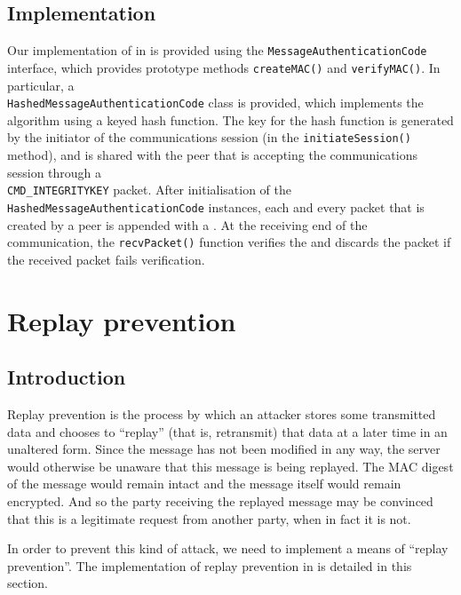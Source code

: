 \documentclass[a4paper,11pt]{article}
\begin{document}
\subsection{Implementation}
Our implementation of  in \packageName{}
is provided using the \verb+MessageAuthenticationCode+ interface, which provides
prototype methods \verb+createMAC()+ and \verb+verifyMAC()+. In particular, a \\
\verb+HashedMessageAuthenticationCode+ class is provided, which implements the
 algorithm using a keyed 
hash function. The key for the hash function is generated by the initiator of
the communications session (in the \verb+initiateSession()+ method), and is
shared with the peer that is accepting the communications session through a \\
\verb+CMD_INTEGRITYKEY+ packet. After initialisation of the \\
\verb+HashedMessageAuthenticationCode+ instances, each and every packet that is
created by a peer is appended with a .
At the receiving end of the communication, the \verb+recvPacket()+ function
verifies the  and discards the packet if
the received packet fails verification.

\section{Replay prevention}

\subsection{Introduction}
Replay prevention is the process by which an attacker stores some transmitted
data and chooses to ``replay'' (that is, retransmit) that data at a later time
in an unaltered form. Since the message has not been modified in any way, the
server would otherwise be unaware that this message is being replayed. The MAC
digest of the message would remain intact and the message itself would remain
encrypted. And so the party receiving the replayed message may be convinced that
this is a legitimate request from another party, when in fact it is not.

In order to prevent this kind of attack, we need to implement a means of
``replay prevention''. The implementation of replay prevention in \packageName{}
is detailed in this section.
\end{document}

